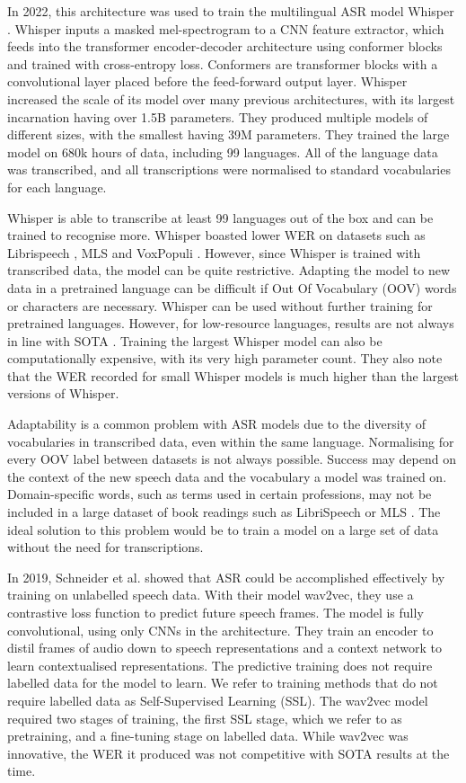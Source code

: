 In 2022, this architecture was used to train the multilingual ASR model Whisper \cite{whisper}. Whisper inputs a masked mel-spectrogram to a CNN feature extractor, which feeds into the transformer encoder-decoder architecture using conformer blocks \cite{gulati2020conformer} and trained with cross-entropy loss. Conformers are transformer blocks with a convolutional layer placed before the feed-forward output layer. Whisper increased the scale of its model over many previous architectures, with its largest incarnation having over 1.5B parameters. They produced multiple models of different sizes, with the smallest having 39M parameters. They trained the large model on 680k hours of data, including 99 languages. All of the language data was transcribed, and all transcriptions were normalised to standard vocabularies for each language. 

Whisper is able to transcribe at least 99 languages out of the box and can be trained to recognise more. Whisper boasted lower WER on datasets such as Librispeech \cite{librispeech}, MLS \cite{MLS} and VoxPopuli \cite{wang-etal-2021-voxpopuli}. However, since Whisper is trained with transcribed data, the model can be quite restrictive. Adapting the model to new data in a pretrained language can be difficult if Out Of Vocabulary (OOV) words or characters are necessary. Whisper can be used without further training for pretrained languages. However, for low-resource languages, results are not always in line with SOTA  \cite{FLEURS_XLSR_WHISPER}. Training the largest Whisper model can also be computationally expensive, with its very high parameter count. They also note that the WER recorded for small Whisper models is much higher than the largest versions of Whisper.

Adaptability is a common problem with ASR models due to the diversity of vocabularies in transcribed data, even within the same language. Normalising for every OOV label between datasets is not always possible. Success may depend on the context of the new speech data and the vocabulary a model was trained on. Domain-specific words, such as terms used in certain professions, may not be included in a large dataset of book readings such as LibriSpeech or MLS \cite{librispeech, MLS, luo2021cross}. The ideal solution to this problem would be to train a model on a large set of data without the need for transcriptions. 

In 2019, Schneider et al. \cite{schneider2019wav2vec} showed that ASR could be accomplished effectively by training on unlabelled speech data. With their model wav2vec, they use a contrastive loss function to predict future speech frames. The model is fully convolutional, using only CNNs in the architecture. They train an encoder to distil frames of audio down to speech representations and a context network to learn contextualised representations. The predictive training does not require labelled data for the model to learn. We refer to training methods that do not require labelled data as Self-Supervised Learning (SSL). The wav2vec model required two stages of training, the first SSL stage, which we refer to as pretraining, and a fine-tuning stage on labelled data. While wav2vec was innovative, the WER it produced was not competitive with SOTA results at the time.



